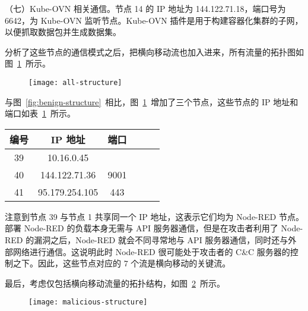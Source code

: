 {（七）Kube-OVN 相关通信。节点 14 的 IP 地址为 144.122.71.18，端口号为 6642，为 Kube-OVN 监听节点。Kube-OVN 插件是用于构建容器化集群的子网，以便抓取数据包并生成数据集。

分析了这些节点的通信模式之后，把横向移动流也加入进来，所有流量的拓扑图如图~\ref{fig:all-structure}~所示。

\begin{figure}[!htbp]
    \centering
    \texttt{[image: all-structure]}
    \label{fig:all-structure}

\end{figure}

与图~\ref{fig:benign-structure}~相比，图~\ref{fig:all-structure}~增加了三个节点，这些节点的 IP 地址和端口如表~\ref{tab:all-structure}~所示。

\begin{table}[t]
    \label{tab:all-structure}
    \centering
    \footnotesize%
    \setlength{\tabcolsep}{4pt}%
    \renewcommand{\arraystretch}{1.2}%
    \begin{tabular}{cccccc}
        \hline
        编号 & IP 地址 & 端口\\
        \hline
        39 & 10.16.0.45 & \geq 32768\\
        40 & 144.122.71.36 & 9001\\
        41 & 95.179.254.105 & 443\\
        \hline
    \end{tabular}
\end{table}

注意到节点 39 与节点 1 共享同一个 IP 地址，这表示它们均为 Node-RED 节点。部署 Node-RED 的负载本身无需与 API 服务器通信，但是在攻击者利用了 Node-RED 的漏洞之后，Node-RED 就会不同寻常地与 API 服务器通信，同时还与外部网络进行通信。这说明此时 Node-RED 很可能处于攻击者的 C\&C 服务器的控制之下。因此，这些节点对应的 $7$ 个流是横向移动的关键流。

最后，考虑仅包括横向移动流量的拓扑结构，如图~\ref{fig:malicious-structure}~所示。

\begin{figure}[t]
    \centering
    \texttt{[image: malicious-structure]}
    \label{fig:malicious-structure}


\end{figure}}
